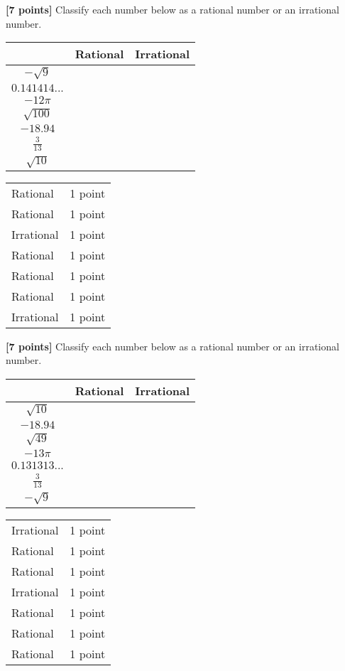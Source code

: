 {
	{\footnotesize\textbf{[7 points]}} Classify each number below as a rational number or an irrational number.
	
	\begin{tabular}{|c|c|c|} 
	\hline
	 & Rational & Irrational\\
	\hline
	$-\sqrt{9}$ & & \\
	\hline
	$0.141414...$ & & \\
	\hline
	$-12\pi$ & & \\
	\hline
	$\sqrt{100}$ & & \\
	\hline 
	$-18.94$ & & \\
	\hline
	$\frac{3}{13}$ & & \\
	\hline
	$\sqrt{10}$ & & \\
	\hline
	\end{tabular}
}
{
	\begin{tabular}{l r}
	Rational & 1 point\\
	Rational & 1 point\\
	Irrational & 1 point \\
	Rational & 1 point\\
	Rational & 1 point \\
	Rational & 1 point \\
	Irrational & 1 point \\
	\end{tabular}
}

{
	{\footnotesize\textbf{[7 points]}} Classify each number below as a rational number or an irrational number.
	
	\begin{tabular}{|c|c|c|} 
	\hline
	 & Rational & Irrational\\
	\hline
	$\sqrt{10}$ & & \\
	\hline
	$-18.94$ & & \\
	\hline
	$\sqrt{49}$ & & \\
	\hline
	$-13\pi$ & & \\
	\hline 
	$0.131313...$ & & \\
	\hline
	$\frac{3}{13}$ & & \\
	\hline
	$-\sqrt{9}$ & & \\
	\hline
	\end{tabular}
}
{
	\begin{tabular}{l r}
	Irrational & 1 point\\
	Rational & 1 point\\
	Rational & 1 point \\
	Irrational & 1 point\\
	Rational & 1 point \\
	Rational & 1 point \\
	Rational & 1 point \\
	\end{tabular}
}
